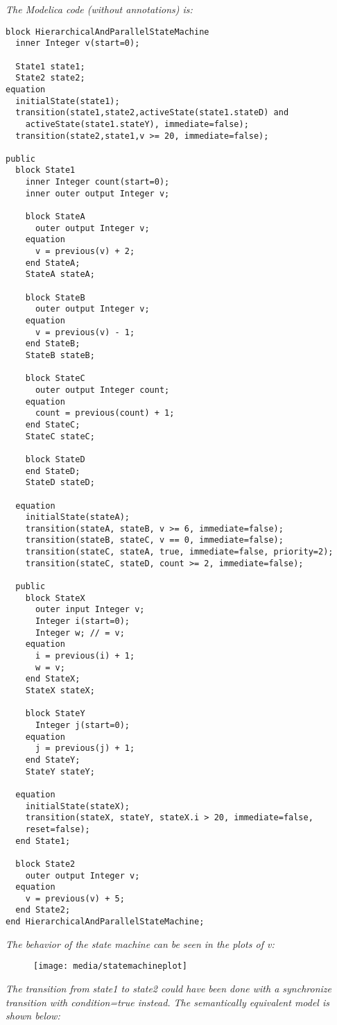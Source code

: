 \emph{The Modelica code (without annotations) is:}

\begin{lstlisting}[language=modelica]
block HierarchicalAndParallelStateMachine
  inner Integer v(start=0);

  State1 state1;
  State2 state2;
equation 
  initialState(state1);
  transition(state1,state2,activeState(state1.stateD) and
    activeState(state1.stateY), immediate=false);
  transition(state2,state1,v >= 20, immediate=false);
  
public 
  block State1
    inner Integer count(start=0);
    inner outer output Integer v;
    
    block StateA
      outer output Integer v;
    equation 
      v = previous(v) + 2;
    end StateA;
    StateA stateA;
    
    block StateB
      outer output Integer v;
    equation 
      v = previous(v) - 1;
    end StateB;
    StateB stateB;
    
    block StateC
      outer output Integer count;
    equation 
      count = previous(count) + 1;
    end StateC;
    StateC stateC;
    
    block StateD
    end StateD;
    StateD stateD;
    
  equation 
    initialState(stateA);
    transition(stateA, stateB, v >= 6, immediate=false);
    transition(stateB, stateC, v == 0, immediate=false);
    transition(stateC, stateA, true, immediate=false, priority=2);
    transition(stateC, stateD, count >= 2, immediate=false);
  
  public 
    block StateX
      outer input Integer v;
      Integer i(start=0);
      Integer w; // = v;
    equation 
      i = previous(i) + 1;
      w = v;
    end StateX;
    StateX stateX;
    
    block StateY
      Integer j(start=0);
    equation 
      j = previous(j) + 1;
    end StateY;
    StateY stateY;
    
  equation 
    initialState(stateX);
    transition(stateX, stateY, stateX.i > 20, immediate=false,
    reset=false);
  end State1;

  block State2
    outer output Integer v;
  equation 
    v = previous(v) + 5;
  end State2;
end HierarchicalAndParallelStateMachine;
\end{lstlisting}

\emph{The behavior of the state machine can be seen in the plots of v:}
\begin{figure}
\texttt{[image: media/statemachineplot]}
\end{figure}
\emph{The transition from state1 to state2 could have been done with a
synchronize transition with condition=true instead. The semantically
equivalent model is shown below:}

